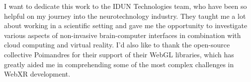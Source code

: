 \begin{dedication}

	I want to dedicate this work to the IDUN Technologies team, who have been so helpful on my journey into the neurotechnology industry. They taught me a lot about working in a scientific setting and gave me the opportunity to investigate various aspects of non-invasive brain-computer interfaces in combination with cloud computing and virtual reality. I'd also like to thank the open-source collective Poimandres for their support of their WebGL libraries, which has greatly aided me in comprehending some of the most complex challenges in WebXR development.

\end{dedication}